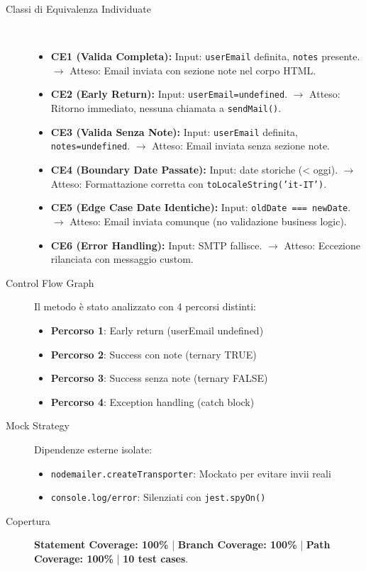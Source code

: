 \begin{description}
    \item[Classi di Equivalenza Individuate] ~\\
    \begin{itemize}
        \item \textbf{CE1 (Valida Completa):} Input: \texttt{userEmail} definita, \texttt{notes} presente. $\rightarrow$ Atteso: Email inviata con sezione note nel corpo HTML.
        \item \textbf{CE2 (Early Return):} Input: \texttt{userEmail=undefined}. $\rightarrow$ Atteso: Ritorno immediato, nessuna chiamata a \texttt{sendMail()}.
        \item \textbf{CE3 (Valida Senza Note):} Input: \texttt{userEmail} definita, \texttt{notes=undefined}. $\rightarrow$ Atteso: Email inviata senza sezione note.
        \item \textbf{CE4 (Boundary Date Passate):} Input: date storiche (< oggi). $\rightarrow$ Atteso: Formattazione corretta con \texttt{toLocaleString('it-IT')}.
        \item \textbf{CE5 (Edge Case Date Identiche):} Input: \texttt{oldDate === newDate}. $\rightarrow$ Atteso: Email inviata comunque (no validazione business logic).
        \item \textbf{CE6 (Error Handling):} Input: SMTP fallisce. $\rightarrow$ Atteso: Eccezione rilanciata con messaggio custom.
    \end{itemize}
    
    \item[Control Flow Graph] Il metodo è stato analizzato con 4 percorsi distinti:
    \begin{itemize}
        \item \textbf{Percorso 1}: Early return (userEmail undefined)
        \item \textbf{Percorso 2}: Success con note (ternary TRUE)
        \item \textbf{Percorso 3}: Success senza note (ternary FALSE)
        \item \textbf{Percorso 4}: Exception handling (catch block)
    \end{itemize}
    
    \item[Mock Strategy] Dipendenze esterne isolate:
    \begin{itemize}
        \item \texttt{nodemailer.createTransporter}: Mockato per evitare invii reali
        \item \texttt{console.log/error}: Silenziati con \texttt{jest.spyOn()}
    \end{itemize}
    
    \item[Copertura] \textbf{Statement Coverage: 100\%} | \textbf{Branch Coverage: 100\%} | \textbf{Path Coverage: 100\%} | \textbf{10 test cases}.
\end{description}

